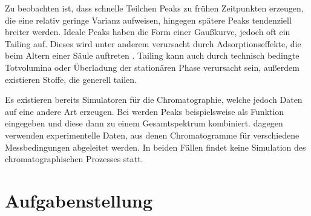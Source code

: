\documentclass[a4paper,10pt]{article}
\begin{document}


Zu beobachten ist, dass schnelle Teilchen Peaks zu frühen Zeitpunkten erzeugen, die eine relativ geringe Varianz aufweisen, hingegen spätere Peaks tendenziell breiter werden. Ideale Peaks haben die Form einer Gaußkurve, jedoch oft ein Tailing auf. Dieses wird unter anderem verursacht durch Adsorptionseffekte, die beim Altern einer Säule auftreten \cite{kolb2003}. Tailing kann auch durch technisch bedingte Totvolumina oder Überladung der stationären Phase verursacht sein, außerdem existieren Stoffe, die generell tailen.

Es existieren bereits Simulatoren für die Chromatographie, welche jedoch Daten auf eine andere Art erzeugen. Bei \cite{spreadsheet} werden Peaks beispielsweise als Funktion eingegeben und diese dann zu einem Gesamtspektrum kombiniert. \cite{hplcsim} dagegen verwenden experimentelle Daten, aus denen Chromatogramme für verschiedene Messbedingungen abgeleitet werden. In beiden Fällen findet keine Simulation des chromatographischen Prozesses statt.


\section{Aufgabenstellung}
\end{document}
